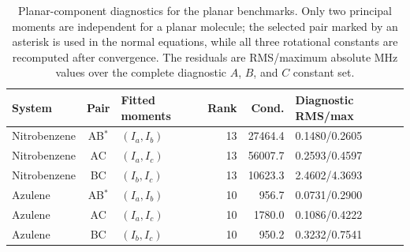\begin{table}
\caption{Planar-component diagnostics for the planar benchmarks. Only two
principal moments are independent for a planar molecule; the selected pair
marked by an asterisk is used in the normal equations, while all three
rotational constants are recomputed after convergence. The residuals are
RMS/maximum absolute MHz values over the complete diagnostic $A$, $B$, and $C$
constant set.}
\label{tab:planar-pair-diagnostics}
\scriptsize
\setlength{\tabcolsep}{4pt}
\begin{tabular}{@{}lclrrl@{}}
\toprule
System & Pair & Fitted moments & Rank & Cond. & Diagnostic RMS/max \\
\midrule
Nitrobenzene & AB$^\ast$ & $(I_a,I_b)$ & 13 & 27464.4 & 0.1480/0.2605 \\
Nitrobenzene & AC & $(I_a,I_c)$ & 13 & 56007.7 & 0.2593/0.4597 \\
Nitrobenzene & BC & $(I_b,I_c)$ & 13 & 10623.3 & 2.4602/4.3693 \\
Azulene & AB$^\ast$ & $(I_a,I_b)$ & 10 & 956.7 & 0.0731/0.2900 \\
Azulene & AC & $(I_a,I_c)$ & 10 & 1780.0 & 0.1086/0.4222 \\
Azulene & BC & $(I_b,I_c)$ & 10 & 950.2 & 0.3232/0.7541 \\
\bottomrule
\end{tabular}
\end{table}
